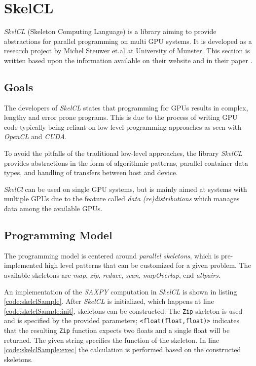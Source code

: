 \section{SkelCL}
\textit{SkelCL} (Skeleton Computing Language) is a library aiming to provide abstractions for parallel programming on multi GPU systems. It is developed as a research project by Michel Steuwer et.al at University of Munster. This section is written based upon the information available on their website \cite{skelclWebsite} and in their paper \cite{skelclPaper}.

\subsection{Goals}
The developers of \textit{SkelCL} states that programming for GPUs results in complex, lengthy and error prone programs. This is due to the process of writing GPU code typically being reliant on low-level programming approaches as seen with \textit{OpenCL} and \textit{CUDA}. 

To avoid the pitfalls of the traditional low-level approaches, the library \textit{SkelCL} provides abstractions in the form of algorithmic patterns, parallel container data types, and handling of transfers between host and device. 

\textit{SkelCl} can be used on single GPU systems, but is mainly aimed at systems with multiple GPUs due to the feature called \textit{data (re)distributions} which manages data among the available GPUs.

\subsection{Programming Model}
The programming model is centered around \textit{parallel skeletons}, which is pre-implemented high level patterns that can be customized for a given problem. The available skeletons are \textit{map}, \textit{zip}, \textit{reduce}, \textit{scan}, \textit{mapOverlap}, end \textit{allpairs}.

An implementation of the \textit{SAXPY} computation in \textit{SkelCL} is shown in listing \ref{code:skelclSample}. After \textit{SkelCL} is initialized, which happens at line \ref{code:skelclSample:init}, skeletons can be constructed. The \texttt{Zip} skeleton is used and is specified by the provided parameters; \texttt{<float(float,float)>} indicates that the resulting \texttt{Zip} function expects two floats and a single float will be returned. The given string specifies the function of the skeleton. In line \ref{code:skelclSample:exec} the calculation is performed based on the constructed skeletons.

